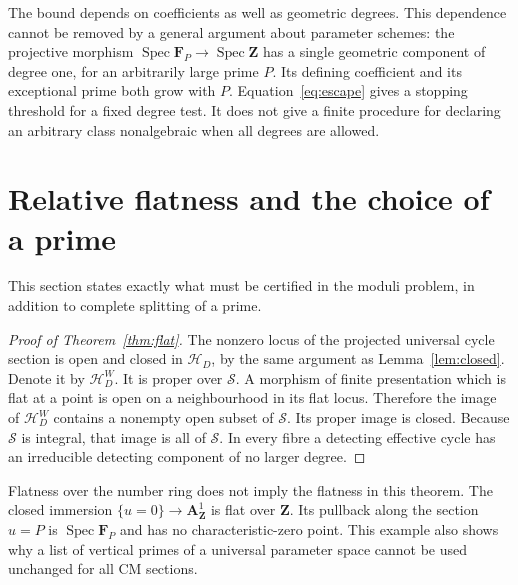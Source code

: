 \documentclass[11pt]{article}
\theoremstyle{definition}
\theoremstyle{remark}
\newcommand{\Z}{\mathbf Z}
\newcommand{\Spec}{\operatorname{Spec}}
\begin{document}
The bound depends on coefficients as well as geometric degrees.
This dependence cannot be removed by a general argument about
parameter schemes: the projective morphism
$\Spec\mathbf F_P\to\Spec\Z$ has a single geometric component
of degree one, for an arbitrarily large prime $P$. Its defining
coefficient and its exceptional prime both grow with $P$.
Equation~\eqref{eq:escape} gives a stopping threshold for a fixed
degree test. It does not give a finite procedure for declaring
an arbitrary class nonalgebraic when all degrees are allowed.

\section{Relative flatness and the choice of a prime}

This section states exactly what must be certified in the
moduli problem, in addition to complete splitting of a prime.

\begin{proof}[Proof of Theorem~\ref{thm:flat}]
The nonzero locus of the projected universal cycle section is
open and closed in $\mathscr H_D$, by the same argument as
Lemma~\ref{lem:closed}. Denote it by $\mathscr H_D^W$.
It is proper over $\mathcal S$. A morphism of finite presentation
which is flat at a point is open on a neighbourhood in its flat
locus. Therefore the image of $\mathscr H_D^W$ contains a
nonempty open subset of $\mathcal S$. Its proper image is closed.
Because $\mathcal S$ is integral, that image is all of
$\mathcal S$. In every fibre a detecting effective cycle has
an irreducible detecting component of no larger degree.
\end{proof}

Flatness over the number ring does not imply the flatness in
this theorem. The closed immersion
$\{u=0\}\to\mathbf A^1_{\Z}$ is flat over $\Z$. Its pullback
along the section $u=P$ is $\Spec\mathbf F_P$ and has no
characteristic-zero point. This example also shows why a list
of vertical primes of a universal parameter space cannot be
used unchanged for all CM sections.
\end{document}
